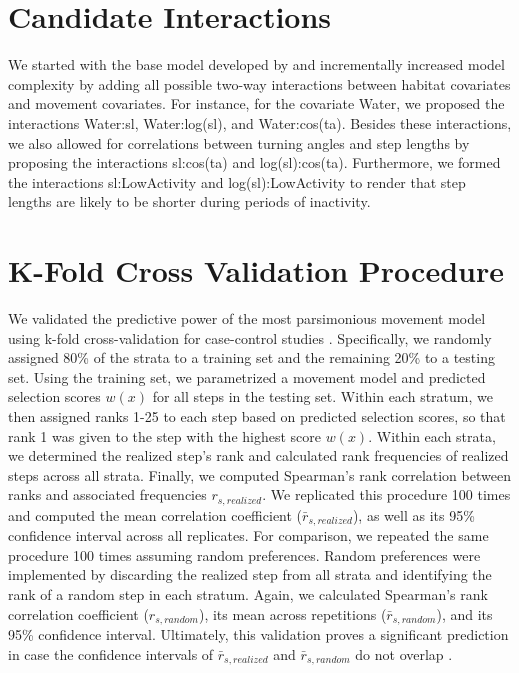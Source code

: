 \documentclass[abstract=off,10pt,a4paper,bibliography=totocnumbered]{article}
\begin{document}
\section{Candidate Interactions}
We started with the base model developed by \cite{Hofmann.2021} and
incrementally increased model complexity by adding all possible two-way
interactions between habitat covariates and movement covariates. For instance,
for the covariate \textsf{Water}, we proposed the interactions
\textsf{Water:sl}, \textsf{Water:log(sl)}, and \textsf{Water:cos(ta)}. Besides
these interactions, we also allowed for correlations between turning angles and
step lengths by proposing the interactions \textsf{sl:cos(ta)} and
\textsf{log(sl):cos(ta)}. Furthermore, we formed the interactions
\textsf{sl:LowActivity} and \textsf{log(sl):LowActivity} to render that step
lengths are likely to be shorter during periods of inactivity.

\newpage
\section{K-Fold Cross Validation Procedure}
We validated the predictive power of the most parsimonious movement model using
k-fold cross-validation for case-control studies \cite{Fortin.2009}.
Specifically, we randomly assigned 80\% of the strata to a training set and the
remaining 20\% to a testing set. Using the training set, we parametrized a
movement model and predicted selection scores \(w(x)\) for all steps in the
testing set. Within each stratum, we then assigned ranks 1-25 to each step based
on predicted selection scores, so that rank 1 was given to the step with the
highest score \(w(x)\). Within each strata, we determined the realized step's
rank and calculated rank frequencies of realized steps across all strata.
Finally, we computed Spearman's rank correlation between ranks and associated
frequencies \(r_{s, realized}\). We replicated this procedure 100 times and
computed the mean correlation coefficient (\(\bar{r}_{s, realized}\)), as well
as its 95\% confidence interval across all replicates. For comparison, we
repeated the same procedure 100 times assuming random preferences. Random
preferences were implemented by discarding the realized step from all strata and
identifying the rank of a random step in each stratum. Again, we calculated
Spearman's rank correlation coefficient (\(r_{s, random}\)), its mean across
repetitions (\(\bar{r}_{s, random}\)), and its 95\% confidence interval.
Ultimately, this validation proves a significant prediction in case the
confidence intervals of \(\bar{r}_{s, realized}\) and \(\bar{r}_{s, random}\) do
not overlap \citep{Fortin.2009}.
\end{document}
